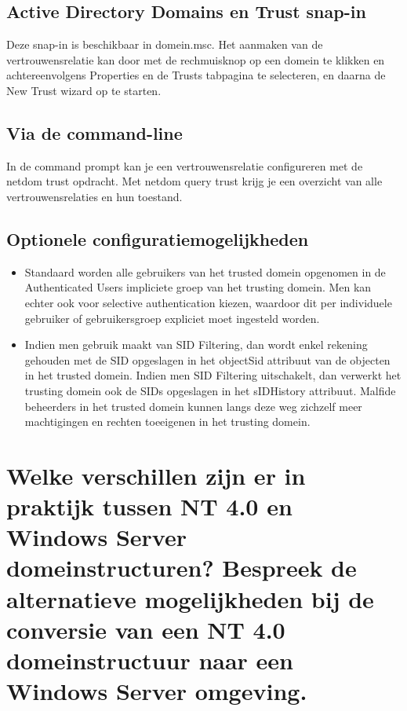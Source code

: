 \subsection{Active Directory Domains en Trust snap-in}

Deze snap-in is beschikbaar in domein.msc. Het aanmaken van de
vertrouwensrelatie kan door met de rechmuisknop op een domein te klikken en
achtereenvolgens Properties en de Trusts tabpagina te selecteren, en daarna de
New Trust wizard op te starten.

\subsection{Via de command-line}

In de command prompt kan je een vertrouwensrelatie configureren met de netdom
trust opdracht. Met netdom query trust krijg je een overzicht van alle
vertrouwensrelaties en hun toestand.

\subsection{Optionele configuratiemogelijkheden}
\begin{itemize}
	\item Standaard worden alle gebruikers van het trusted domein opgenomen
		in de Authenticated Users impliciete groep van het trusting
		domein. Men kan echter ook voor selective authentication kiezen,
		waardoor dit per individuele gebruiker of gebruikersgroep
		expliciet moet ingesteld worden.
	\item Indien men gebruik maakt van SID Filtering, dan wordt enkel
		rekening gehouden met de SID opgeslagen in het objectSid
		attribuut van de objecten in het trusted domein. Indien men SID
		Filtering uitschakelt, dan verwerkt het trusting domein ook de
		SIDs opgeslagen in het sIDHistory attribuut. Malfide beheerders
		in het trusted domein kunnen langs deze weg zichzelf meer
		machtigingen en rechten toeeigenen in het trusting domein.
\end{itemize}

\section{Welke verschillen zijn er in praktijk tussen NT 4.0 en Windows Server
domeinstructuren? Bespreek de alternatieve mogelijkheden bij de conversie van
een NT 4.0 domeinstructuur naar een Windows Server omgeving.}

